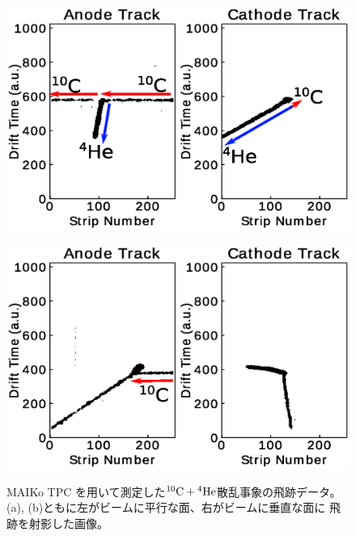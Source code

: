 \documentclass[12pt,a4paper]{jsarticle}
\begin{document}
\begin{figure}[h]
  \begin{minipage}{0.5\hsize}
    \begin{center}
      \includegraphics[clip,width=0.8\columnwidth]{true.eps}
    \end{center}
    \vspace*{-1\intextsep}
    \label{fig:true}
  \end{minipage}
  \begin{minipage}{0.5\hsize}
    \begin{center}
      \includegraphics[clip,width=0.8\columnwidth]{false.eps}
    \end{center}
    \vspace*{-1\intextsep}
    \label{fig:false}
  \end{minipage}
  \vspace*{-0.7\intextsep}
  \caption{\small
    MAIKo TPC を用いて測定した${}^{10}\rm{C} + {}^{4}\rm{He}$散乱事象の飛跡データ。
    (a), (b)ともに左がビームに平行な面、右がビームに垂直な面に
    飛跡を射影した画像。
  }
\end{figure}
\end{document}
